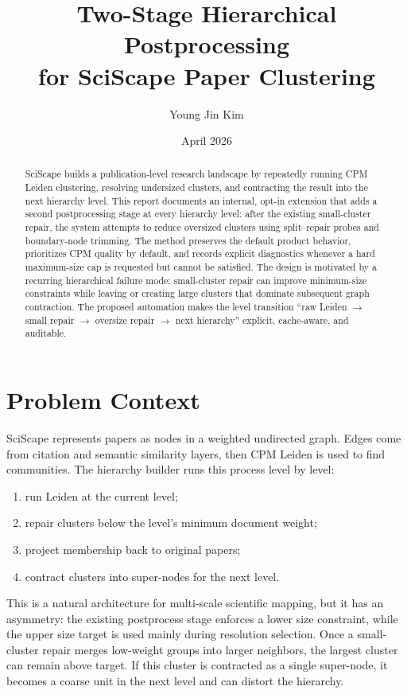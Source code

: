 \documentclass[11pt,a4paper]{article}
\title{\textbf{Two-Stage Hierarchical Postprocessing\\for SciScape Paper Clustering}}
\author{Young Jin Kim}
\date{April 2026}
\begin{document}
\maketitle

\begin{abstract}
SciScape builds a publication-level research landscape by repeatedly running
CPM Leiden clustering, resolving undersized clusters, and contracting the
result into the next hierarchy level. This report documents an internal,
opt-in extension that adds a second postprocessing stage at every hierarchy
level: after the existing small-cluster repair, the system attempts to reduce
oversized clusters using split--repair probes and boundary-node trimming. The
method preserves the default product behavior, prioritizes CPM quality by
default, and records explicit diagnostics whenever a hard maximum-size cap is
requested but cannot be satisfied. The design is motivated by a recurring
hierarchical failure mode: small-cluster repair can improve minimum-size
constraints while leaving or creating large clusters that dominate subsequent
graph contraction. The proposed automation makes the level transition
``raw Leiden $\rightarrow$ small repair $\rightarrow$ oversize repair
$\rightarrow$ next hierarchy'' explicit, cache-aware, and auditable.
\end{abstract}

\section{Problem Context}

SciScape represents papers as nodes in a weighted undirected graph. Edges come
from citation and semantic similarity layers, then CPM Leiden is used to find
communities. The hierarchy builder runs this process level by level:

\begin{enumerate}[nosep]
    \item run Leiden at the current level;
    \item repair clusters below the level's minimum document weight;
    \item project membership back to original papers;
    \item contract clusters into super-nodes for the next level.
\end{enumerate}

This is a natural architecture for multi-scale scientific mapping, but it has
an asymmetry: the existing postprocess stage enforces a lower size constraint,
while the upper size target is used mainly during resolution selection. Once a
small-cluster repair merges low-weight groups into larger neighbors, the
largest cluster can remain above target. If this cluster is contracted as a
single super-node, it becomes a coarse unit in the next level and can distort
the hierarchy.
\end{document}
